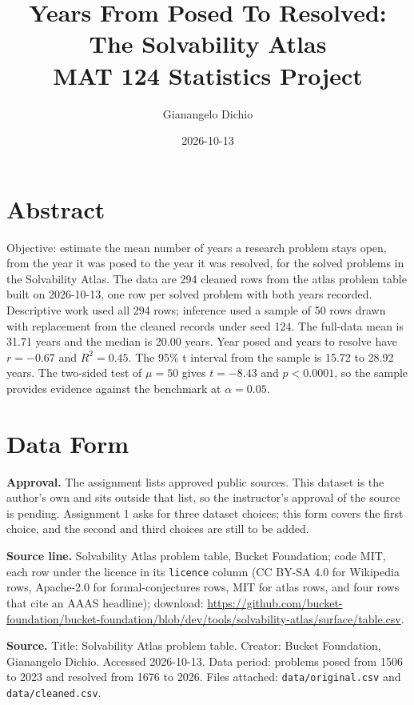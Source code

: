 \documentclass[11pt]{article}
\title{Years From Posed To Resolved: The Solvability Atlas\\\large MAT 124 Statistics Project}
\author{Gianangelo Dichio}
\date{2026-10-13}
\begin{document}
\maketitle


\section*{Abstract}
\noindent{}

\medskip
Objective: estimate the mean number of years a research problem stays open, from the year it was posed to the year it was resolved, for the solved problems in the Solvability Atlas. The data are 294 cleaned rows from the atlas problem table built on 2026-10-13, one row per solved problem with both years recorded. Descriptive work used all 294 rows; inference used a sample of 50 rows drawn with replacement from the cleaned records under seed 124. The full-data mean is 31.71 years and the median is 20.00 years. Year posed and years to resolve have $r = -0.67$ and $R^2 = 0.45$. The 95\% t interval from the sample is 15.72 to 28.92 years. The two-sided test of $\mu = 50$ gives $t = -8.43$ and $p < 0.0001$, so the sample provides evidence against the benchmark at $\alpha = 0.05$.


\section{Data Form}

\textbf{Approval.} The assignment lists approved public sources. This dataset is the author's own and sits outside that list, so the instructor's approval of the source is pending. Assignment 1 asks for three dataset choices; this form covers the first choice, and the second and third choices are still to be added.

\textbf{Source line.} Solvability Atlas problem table, Bucket Foundation; code MIT, each row under the licence in its \texttt{licence} column (CC BY-SA 4.0 for Wikipedia rows, Apache-2.0 for formal-conjectures rows, MIT for atlas rows, and four rows that cite an AAAS headline); download: \url{https://github.com/bucket-foundation/bucket-foundation/blob/dev/tools/solvability-atlas/surface/table.csv}.

\textbf{Source.} Title: Solvability Atlas problem table. Creator: Bucket Foundation, Gianangelo Dichio. Accessed 2026-10-13. Data period: problems posed from 1506 to 2023 and resolved from 1676 to 2026. Files attached: \texttt{data/original.csv} and \texttt{data/cleaned.csv}.
\end{document}
